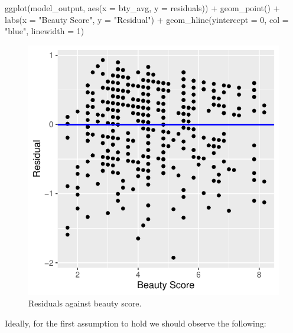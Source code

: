 \documentclass[
  letterpaper,
  DIV=11,
  numbers=noendperiod]{scrartcl}
\newenvironment{Shaded}{\begin{snugshade}}{\end{snugshade}}
\newcommand{\AttributeTok}[1]{\textcolor[rgb]{0.40,0.45,0.13}{#1}}
\newcommand{\DecValTok}[1]{\textcolor[rgb]{0.68,0.00,0.00}{#1}}
\newcommand{\FunctionTok}[1]{\textcolor[rgb]{0.28,0.35,0.67}{#1}}
\newcommand{\NormalTok}[1]{\textcolor[rgb]{0.00,0.23,0.31}{#1}}
\newcommand{\SpecialCharTok}[1]{\textcolor[rgb]{0.37,0.37,0.37}{#1}}
\newcommand{\StringTok}[1]{\textcolor[rgb]{0.13,0.47,0.30}{#1}}
\begin{document}
\begin{Shaded}
\begin{Highlighting}[]
\FunctionTok{ggplot}\NormalTok{(model\_output, }\FunctionTok{aes}\NormalTok{(}\AttributeTok{x =}\NormalTok{ bty\_avg, }\AttributeTok{y =}\NormalTok{ residuals)) }\SpecialCharTok{+}
  \FunctionTok{geom\_point}\NormalTok{() }\SpecialCharTok{+}
  \FunctionTok{labs}\NormalTok{(}\AttributeTok{x =} \StringTok{"Beauty Score"}\NormalTok{, }\AttributeTok{y =} \StringTok{"Residual"}\NormalTok{) }\SpecialCharTok{+}
  \FunctionTok{geom\_hline}\NormalTok{(}\AttributeTok{yintercept =} \DecValTok{0}\NormalTok{, }\AttributeTok{col =} \StringTok{"blue"}\NormalTok{, }\AttributeTok{linewidth =} \DecValTok{1}\NormalTok{)}
\end{Highlighting}
\end{Shaded}

\begin{figure}[H]

{\centering \includegraphics{index_files/figure-pdf/unnamed-chunk-7-1.pdf}

}

\caption{Residuals against beauty score.}

\end{figure}%

Ideally, for the first assumption to hold we should observe the
following:
\end{document}
